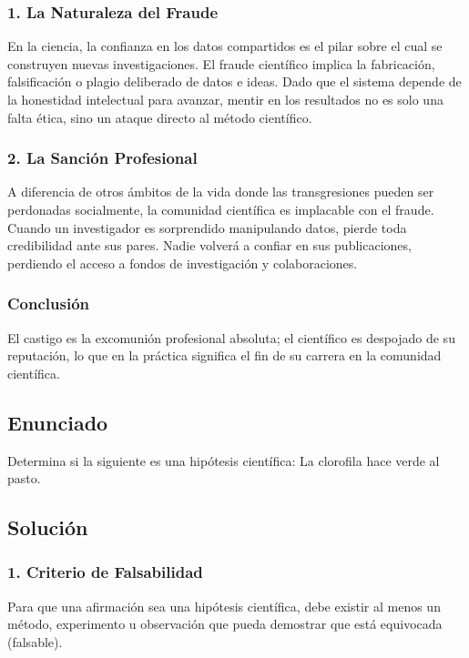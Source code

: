 \documentclass[12pt, a4paper]{article}
\begin{document}
\subsubsection*{1. La Naturaleza del Fraude}
En la ciencia, la confianza en los datos compartidos es el pilar sobre el cual se construyen nuevas investigaciones. El fraude científico implica la fabricación, falsificación o plagio deliberado de datos e ideas. Dado que el sistema depende de la honestidad intelectual para avanzar, mentir en los resultados no es solo una falta ética, sino un ataque directo al método científico.

\subsubsection*{2. La Sanción Profesional}
A diferencia de otros ámbitos de la vida donde las transgresiones pueden ser perdonadas socialmente, la comunidad científica es implacable con el fraude. Cuando un investigador es sorprendido manipulando datos, pierde toda credibilidad ante sus pares. Nadie volverá a confiar en sus publicaciones, perdiendo el acceso a fondos de investigación y colaboraciones.

\subsubsection*{Conclusión}
El castigo es la excomunión profesional absoluta; el científico es despojado de su reputación, lo que en la práctica significa el fin de su carrera en la comunidad científica.

\newpage

\subsection*{Enunciado}
Determina si la siguiente es una hipótesis científica: La clorofila hace verde al pasto.

\subsection*{Solución}

\subsubsection*{1. Criterio de Falsabilidad}
Para que una afirmación sea una hipótesis científica, debe existir al menos un método, experimento u observación que pueda demostrar que está equivocada (falsable).
\end{document}
